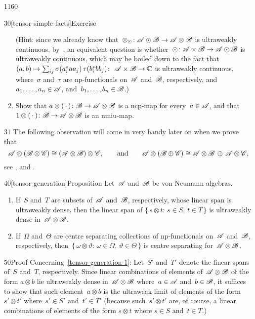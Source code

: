 \begin{parsec}{1160}
\begin{point}{30}[tensor-simple-facts]{Exercise}
\begin{enumerate}
(Hint: since we
already know that~$\otimes_\odot\colon \mathscr{A}\odot\mathscr{B}\to\mathscr{A}\otimes\mathscr{B}$
is ultraweakly continuous, by~,
an equivalent question 
is whether~$\odot\colon \mathscr{A}\times\mathscr{B}\to\mathscr{A}\odot\mathscr{B}$
is ultraweakly continuous,
which may be boiled down
to the fact
that $(a,b)\mapsto \sum_{ij} \sigma(a_i^* a a_j)\,\tau(b_i^* b b_j)\colon
\ \mathscr{A}\times \mathscr{B}\to\mathbb{C}$ is ultraweakly continuous,
where~$\sigma$ and~$\tau$ are np-functionals
on~$\mathscr{A}$ and~$\mathscr{B}$, respectively,
and
$a_1,\dotsc,a_n\in\mathscr{A}$, and~$b_1,\dotsc,b_n\in\mathscr{B}$.)
\item
Show that $a\otimes(\,\cdot\,)\colon \mathscr{B}\to \mathscr{A} \otimes \mathscr{B}$
is a ncp-map for every~$a\in\mathscr{A}$,
and that $1\otimes(\,\cdot\,)\colon \mathscr{B}\to \mathscr{A}\otimes \mathscr{B}$
is an nmiu-map.
\end{enumerate}
\spacingfix%
\end{point}%
\begin{point}{31}%
The following observation will come in very handy later on when we prove that
\begin{equation*}
\mathscr{A}\otimes (\mathscr{B}\otimes \mathscr{C})
    \cong (\mathscr{A}\otimes\mathscr{B})\otimes \mathscr{C},
    \qquad\text{and}\qquad
\mathscr{A}\otimes (\mathscr{B}\oplus\mathscr{C})\cong\mathscr{A}\otimes \mathscr{B}
    \,\oplus\,\mathscr{A}\otimes \mathscr{C},
\end{equation*}
see , and .
\end{point}
\begin{point}{40}[tensor-generation]{Proposition}
Let~$\mathscr{A}$ and~$\mathscr{B}$ 
be von Neumann algebras.
\begin{enumerate}
\item
\label{tensor-generation-1}
If~$S$ and~$T$ are subsets of~$\mathscr{A}$
and~$\mathscr{B}$, respectively,
whose linear span is ultraweakly dense,
then the linear span
of $\{\,s\otimes t\colon\,s\in S,\,t\in T\,\}$
is ultraweakly dense in~$\mathscr{A}\otimes\mathscr{B}$.
\item
\label{tensor-generation-2}
If~$\Omega$ and~$\Theta$ are centre separating collections
of np-functionals on~$\mathscr{A}$ and~$\mathscr{B}$, respectively,
then~$\{\,\omega\otimes\vartheta\colon\, 
\omega\in\Omega,\,\vartheta\in\Theta\,\}$
is centre separating for~$\mathscr{A}\otimes\mathscr{B}$.
\end{enumerate}%
\spacingfix%
\begin{point}{50}{Proof}%
Concerning~\ref{tensor-generation-1}:
Let~$S'$ and~$T'$ denote the linear spans of~$S$
and~$T$, respectively.
Since linear combinations of elements of~$\mathscr{A}\otimes\mathscr{B}$
of the form $a\otimes b$
lie ultraweakly dense in~$\mathscr{A}\otimes\mathscr{B}$ 
where~$a\in\mathscr{A}$ and~$b\in\mathscr{B}$,
it suffices to show that such element~$a\otimes b$
is the ultraweak limit of elements of the form $s'\otimes t'$
where~$s'\in S'$ and~$t'\in T'$
(because such~$s'\otimes t'$ are, of course, a linear combinations
of elements of the form $s\otimes t$ where $s\in S$
    and~$t\in T$.)


\end{point}
\end{point}
\end{parsec}
